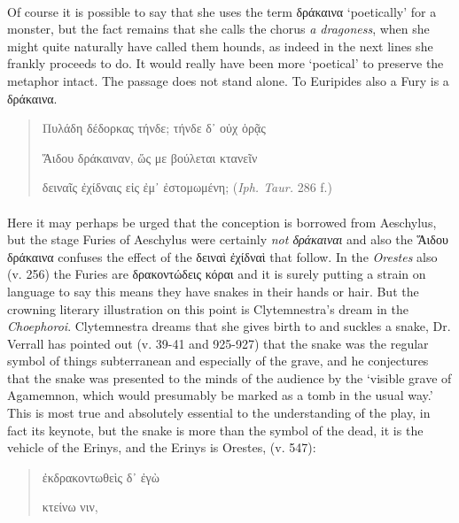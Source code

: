\documentclass[a4paper, 11pt, oneside, polutonikogreek, english]{article}
\begin{document}
\paragraph{}
Of course it is possible to say that she uses the term δράκαινα `poetically' for a monster, but the fact remains that she calls the chorus \emph{a dragoness}, when she might quite naturally have called them hounds, as indeed in the next lines she frankly proceeds to do. It would really have been more `poetical' to preserve the metaphor intact. The passage does not stand alone. To Euripides also a Fury is a δράκαινα.
\begin{quotation}
Πυλάδη δέδορκας τήνδε; τήνδε δ᾽ οὐχ ὁρᾷς

Ἅιδου δράκαιναν, ὥς με βούλεται κτανεῖν

δειναῖς ἐχίδναις εἰς ἐμ᾽ ἐστομωμένη; (\emph{Iph. Taur.} 286 f.)
\end{quotation}
\paragraph{}
Here it may perhaps be urged that the conception is borrowed from Aeschylus, but the stage Furies of Aeschylus were certainly \emph{not δράκαιναι} and also the Ἅιδου δράκαινα confuses the effect of the δειναὶ ἐχίδναὶ that follow. In the \emph{Orestes} also (v. 256) the Furies are δρακοντώδεις κόραι and it is surely putting a strain on language to say this means they have snakes in their hands or hair. But the crowning literary illustration on this point is Clytemnestra's dream in the \emph{Choephoroi}. Clytemnestra dreams that she gives birth to and suckles a snake, Dr. Verrall has pointed out (v. 39-41 and 925-927) that the snake was the regular symbol of things subterranean and especially of the grave, and he conjectures that the snake was presented to the minds of the audience by the `visible grave of Agamemnon, which would presumably be marked as a tomb in the usual way.' This is most true and absolutely essential to the understanding of the play, in fact its keynote, but the snake is more than the symbol of the dead, it is the vehicle of the Erinys, and the Erinys is Orestes, (v. 547):
\begin{quotation}
\hspace*{20mm}ἐκδρακοντωθεὶς δ᾽ ἐγὼ

κτείνω νιν,
\end{quotation}
\end{document}
